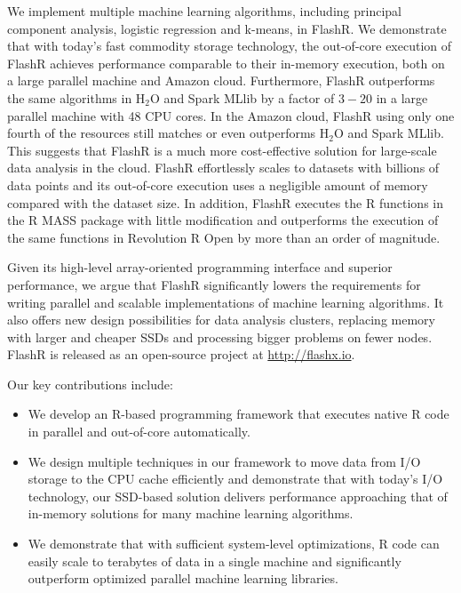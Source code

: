 
We implement multiple machine learning algorithms, including principal component
analysis, logistic regression and k-means, in FlashR. We demonstrate that
with today's fast commodity storage technology, the out-of-core execution of
FlashR achieves performance comparable to their in-memory execution, both
on a large parallel machine and Amazon cloud. Furthermore, FlashR outperforms
the same algorithms in H$_2$O \cite{h2o} and Spark MLlib \cite{spark} by a factor
of $3-20$ in a large parallel machine with 48 CPU cores. In the Amazon cloud,
FlashR using only one fourth of the resources still matches or even outperforms
H$_2$O and Spark MLlib. This suggests that FlashR is a much
more cost-effective solution for large-scale data analysis in the cloud.
FlashR effortlessly scales to datasets with billions
of data points and its out-of-core execution uses a negligible amount of memory
compared with the dataset size. In addition, FlashR executes the R functions
in the R MASS \cite{mass} package with little modification and outperforms
the execution of the same functions in Revolution R Open \cite{rro} by more
than an order of magnitude.

Given its high-level array-oriented programming interface and superior performance,
we argue that FlashR significantly lowers the requirements for writing
parallel and scalable implementations of machine learning algorithms. It also
offers new design possibilities for data analysis clusters, replacing memory
with larger and cheaper SSDs and processing bigger problems on fewer nodes.
FlashR is released as an open-source project at \href{http://flashx.io}{http://flashx.io}.

Our key contributions include:
\begin{itemize}
\item We develop an R-based programming framework that executes native R code
in parallel and out-of-core automatically.
\item We design multiple techniques in our framework to move data from
I/O storage to the CPU cache efficiently and demonstrate that with today's I/O
technology, our SSD-based solution delivers performance approaching that of
in-memory solutions for many machine learning algorithms.
\item We demonstrate that with sufficient system-level optimizations, R code
can easily scale to terabytes of data in a single machine and significantly
outperform optimized parallel machine learning libraries.
\end{itemize}

